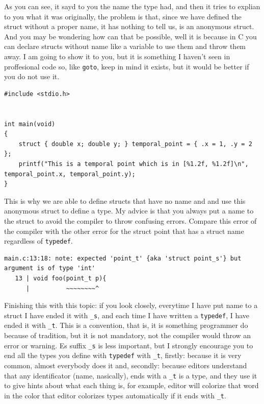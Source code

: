 \documentclass[a4paper]{article}
\begin{document}
As you can see, it sayd to you the name the type had, and then it tries to
explian to you what it was originally, the problem is that, since we have
defined the struct without a proper name, it has nothing to tell us, is an
anonymous struct. And you may be wondering how can that be possible, well it is
because in C you can declare structs without name like a variable to use them
and throw them away. I am going to show it to you, but it is something I haven't
seen in proffesional code so, like \verb!goto!, keep in mind it exists, but
it would be better if you do not use it.

\noindent
\begin{minipage}[H]{\linewidth}
\mbox{}
\begin{lstlisting}[style=C,
caption={Anonymous struct},
label={lst:anonymousStruct}]
#include <stdio.h>


int main(void)
{
    struct { double x; double y; } temporal_point = { .x = 1, .y = 2 };
    printf("This is a temporal point which is in [%1.2f, %1.2f]\n", temporal_point.x, temporal_point.y);
}
\end{lstlisting}
\end{minipage}

This is why we are able to define structs that have no name and and use this
anonymous struct to define a type. My advice is that you always put a name
to the struct to avoid the compiler to throw confusing errors. Compare this
error of the compiler with the other error for the struct point that has a
struct name regardless of \verb"typedef".

\begin{lstlisting}[style=terminalStyle]
main.c:13:18: note: expected 'point_t' {aka 'struct point_s'} but argument is of type 'int'
   13 | void foo(point_t p){
      |          ~~~~~~~~^
\end{lstlisting}

Finishing this with this topic: if you look closely, everytime I have put name
to a struct I have ended it with \verb!_s!, and each time I have written a
\verb!typedef!, I have ended it with \verb!_t!. This is a convention, that is,
it is something programmer do because of tradition, but it is not mandatory,
not the compiler would throw an error or warning. Es suffix \verb!_s! is less
important, but I strongly encourage you to end all the types you define with
\verb"typedef" with \verb!_t!, firstly: because it is very common, almost
everybody does it and, secondly: because editors understand that any
identificator (name, nasically), ends with a \verb!_t! is a type, and they use
it to give hints about what each thing is, for example, editor will colorize
that word in the color that editor colorizes types automatically if it ends with
\verb!_t!.
\end{document}
